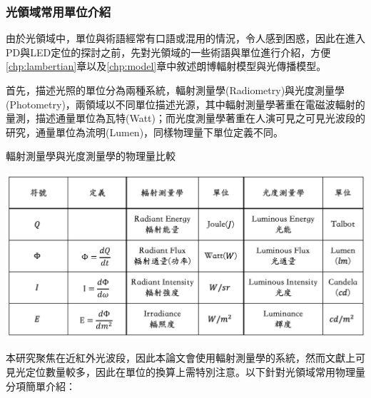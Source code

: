     \subsubsection{光領域常用單位介紹}
    \label{chp:light_unit}
    
    由於光領域中，單位與術語經常有口語或混用的情況，令人感到困惑，因此在進入PD與LED定位的探討之前，先對光領域的一些術語與單位進行介紹，方便\ref{chp:lambertian}章以及\ref{chp:model}章中敘述朗博輻射模型與光傳播模型。

    首先，描述光照的單位分為兩種系統，輻射測量學(Radiometry)與光度測量學(Photometry)，兩領域以不同單位描述光源，其中輻射測量學著重在電磁波輻射的量測，描述通量單位為瓦特(Watt)；而光度測量學著重在人演可見之可見光波段的研究，通量單位為流明(Lumen)，同樣物理量下單位定義不同\cite{radiometry_and_photometry}。
    

    \begin{table}[htpb]
        \centering
        \caption{輻射測量學與光度測量學的物理量比較}
        \label{tab:photometry}
        \includegraphics[width=15cm]{ch2pic/photometry_table.png}      
    \end{table}


    本研究聚焦在近紅外光波段，因此本論文會使用輻射測量學的系統，然而文獻上可見光定位數量較多，因此在單位的換算上需特別注意。以下針對光領域常用物理量分項簡單介紹：

